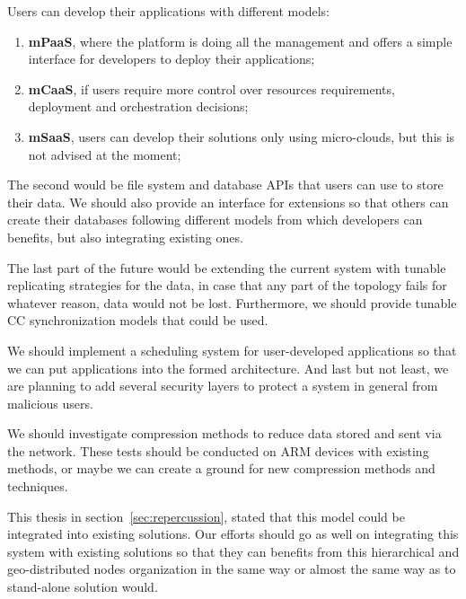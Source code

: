Users can develop their applications with different models: 

\begin{enumerate}[start=1,label={(\bfseries \arabic*)}]
	\item \textbf{mPaaS}, where the platform is doing all the management and offers a simple interface for developers to deploy their applications;
	\item \textbf{mCaaS}, if users require more control over resources requirements, deployment and orchestration decisions;
	\item \textbf{mSaaS}, users can develop their solutions only using micro-clouds, but this is not advised at the moment;
\end{enumerate}

\noindent
The second would be file system and database APIs that users can use to store their data. We should also provide an interface for extensions so that others can create their databases following different models from which developers can benefits, but also integrating existing ones.

The last part of the future would be extending the current system with tunable replicating strategies for the data, in case that any part of the topology fails for whatever reason, data would not be lost. Furthermore, we should provide tunable CC synchronization models that could be used.

We should implement a scheduling system for user-developed applications so that we can put applications into the formed architecture. And last but not least, we are planning to add several security layers to protect a system in general from malicious users.

We should investigate compression methods to reduce data stored and sent via the network. These tests should be conducted on ARM devices with existing methods, or maybe we can create a ground for new compression methods and techniques.

This thesis in section~\ref{sec:repercussion}, stated that this model could be integrated into existing solutions. Our efforts should go as well on integrating this system with existing solutions so that they can benefits from this hierarchical and geo-distributed nodes organization in the same way or almost the same way as to stand-alone solution would.
%
%